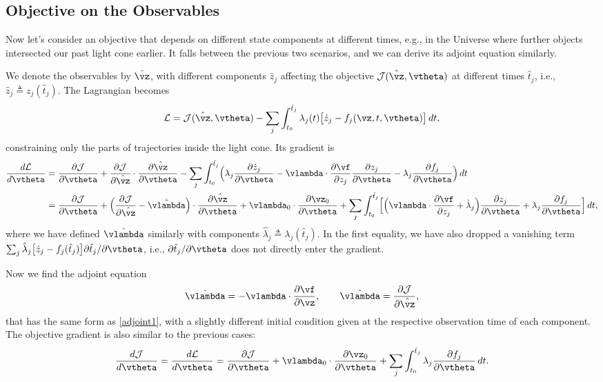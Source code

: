 \documentclass[modern, dvipsnames]{aastex631}
\renewcommand{\d}{d}
\newcommand{\p}{\partial}
\newcommand{\cJ}{\mathcal{J}}
\newcommand{\cL}{\mathcal{L}}
\begin{document}
\vspace{1em}
\subsection{Objective on the Observables}
\label{sec:lightcone}

Now let's consider an objective that depends on different state
components at different times, e.g., in the Universe where further
objects intersected our past light cone earlier.
It falls between the previous two scenarios, and we can derive its
adjoint equation similarly.

We denote the observables by $\hat\vz$, with different components $\hat
z_j$ affecting the objective $\cJ(\hat\vz, \vtheta)$ at different times
$\hat t_j$, i.e., $\hat z_j \triangleq z_j(\hat t_j)$.
The Lagrangian becomes
%
\begin{equation}
\cL = \cJ(\hat\vz, \vtheta)
- \sum_j \int_{t_0}^{\hat t_j} \lambda_j(t)
  \bigl[ \dot z_j - f_j(\vz, t, \vtheta) \bigr] \, \d t,
\end{equation}
%
constraining only the parts of trajectories inside the light cone.
Its gradient is
%
\begin{align}
\frac{\d\cL}{\d\vtheta}
&= \frac{\p\cJ}{\p\vtheta}
+ \frac{\p\cJ}{\p\hat\vz} \cdot \frac{\p\hat\vz}{\p\vtheta}
- \sum_j \int_{t_0}^{\hat t_j}
  \Bigl( \lambda_j \frac{\p\dot z_j}{\p\vtheta}
    - \vlambda \cdot \frac{\p\vf}{\p z_j} \frac{\p z_j}{\p\vtheta}
    - \lambda_j \frac{\p f_j}{\p\vtheta} \Bigr) \, \d t \\
%
&= \frac{\p\cJ}{\p\vtheta}
+ \Bigl( \frac{\p\cJ}{\p\hat\vz} - \hat\vlambda \Bigr)
  \cdot \frac{\p\hat\vz}{\p\vtheta}
+ \vlambda_0 \cdot \frac{\p\vz_0}{\p\vtheta}
+ \sum_j \int_{t_0}^{\hat t_j} \Bigl[
  \Bigl( \vlambda \cdot \frac{\p\vf}{\p z_j} + \dot\lambda_j \Bigr)
  \frac{\p z_j}{\p\vtheta}
  + \lambda_j \frac{\p f_j}{\p\vtheta} \Bigr] \, \d t, \nonumber
\end{align}
%
where we have defined $\hat\vlambda$ similarly with components
$\hat\lambda_j \triangleq \lambda_j(\hat t_j)$.
In the first equality, we have also dropped a vanishing term $\sum_j
\hat\lambda_j \bigl[ \dot z_j - f_j(\hat t_j) \bigr] \p\hat t_j /
\p\vtheta$, i.e., $\p\hat t_j / \p\vtheta$ does not directly enter the
gradient.

Now we find the adjoint equation
%
\begin{equation}
\dot\vlambda = - \vlambda \cdot \frac{\p\vf}{\p\vz},
\qquad
\hat\vlambda = \frac{\p\cJ}{\p\hat\vz},
\end{equation}
%
that has the same form as \eqref{adjoint1}, with a slightly different
initial condition given at the respective observation time of each
component.
The objective gradient is also similar to the previous cases:
%
\begin{equation}
\frac{\d\cJ}{\d\vtheta}
= \frac{\d\cL}{\d\vtheta}
= \frac{\p\cJ}{\p\vtheta} + \vlambda_0 \cdot \frac{\p\vz_0}{\p\vtheta}
+ \sum_j \int_{t_0}^{\hat t_j} \lambda_j \frac{\p f_j}{\p\vtheta} \, \d t.
\end{equation}
\end{document}
